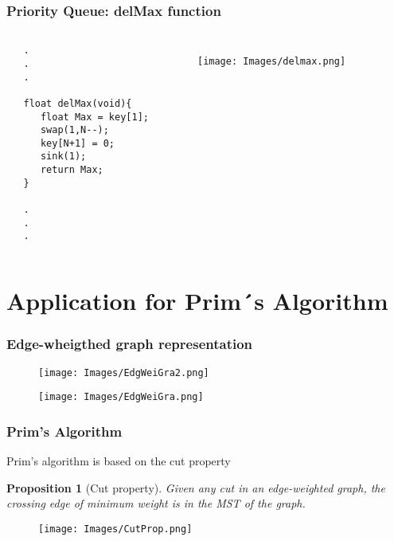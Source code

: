 \documentclass{beamer}
\newtheorem{Prop}{Proposition}
\begin{document}
\begin{frame}[fragile]
\frametitle{Priority Queue: delMax function}
\begin{columns}[c]

\begin{lstlisting}
   .
   .
   .
   
   float delMax(void){
      float Max = key[1];
      swap(1,N--);
      key[N+1] = 0;
      sink(1);
      return Max;
   }

   .
   .
   .
\end{lstlisting}
\begin{figure}[h]
\texttt{[image: Images/delmax.png]}
\centering
\end{figure}

\end{columns}
\end{frame}


\section{Application for Prim´s Algorithm}

\begin{frame}
\frametitle{Edge-wheigthed graph representation}
\begin{figure}[h]
\texttt{[image: Images/EdgWeiGra2.png]}
\centering
\end{figure}
\vspace{-5mm}
\begin{figure}[h]
\texttt{[image: Images/EdgWeiGra.png]}
\centering
\end{figure}
\end{frame}

\begin{frame}
\frametitle{Prim's Algorithm}
Prim's algorithm is based on the cut property
\begin{Prop}[Cut property]
Given any cut in an edge-weighted graph, the crossing edge of minimum weight is in the MST of the graph.
\end{Prop}
\begin{figure}[h]
\texttt{[image: Images/CutProp.png]}
\centering
\end{figure}
\end{frame}
\end{document}
